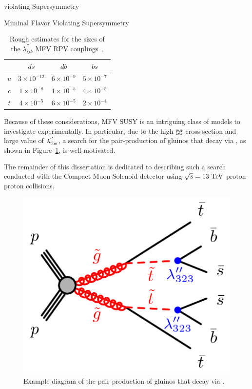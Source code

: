 \begin{section}{\RP violating Supersymmetry}
\begin{subsection}{Miminal Flavor Violating Supersymmetry}
\begin{table}[tbp!]
\centering
\begin{tabular}{ |c|ccc| }
\hline
     &  $ds$                 &  $db$                &  $bs$               \\
\hline
$u$  &  $3 \times 10^{-12}$  &  $6 \times 10^{-9}$  &  $5 \times 10^{-7}$ \\
$c$  &  $1 \times 10^{-8}$   &  $1 \times 10^{-5}$  &  $4 \times 10^{-5}$ \\
$t$  &  $4 \times 10^{-5}$   &  $6 \times 10^{-5}$  &  $2 \times 10^{-4}$ \\
\hline
\end{tabular}
\caption{Rough estimates for the sizes of the $\lambda^{''}_{ijk}$ MFV RPV couplings~\cite{Csaki:2011ge}.}
\label{tab:mfv_couplings}
\end{table}

Because of these considerations, MFV SUSY is an intriguing class of models to investigate experimentally.
In particular, due to the high $\tilde{\mathrm{g}}\tilde{\mathrm{g}}$ cross-section and large value of $\lambda^{''}_{\mathrm{t}\mathrm{b}\mathrm{s}}$, a search for the pair-production of gluinos that decay via \rpvDecay, as shown in Figure~\ref{fig:rpv_decay}, is well-motivated.

The remainder of this dissertation is dedicated to describing such a search conducted with the Compact Muon Solenoid detector using $\sqrt{s} = 13~\mathrm{Te\kern -0.1em V}$ proton-proton collisions.

\begin{figure}[tbp!]
\begin{center}
\includegraphics[angle=0,width=0.40\columnwidth]{fig/rpv_decay.png}
\end{center}
\caption{Example diagram of the pair production of gluinos that decay via \rpvDecay.}
\label{fig:rpv_decay}
\end{figure}

\end{subsection}

\end{section}
